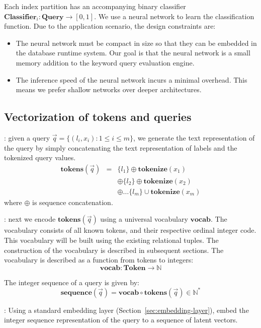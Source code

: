 \documentclass[conference]{IEEEtran}
\begin{document}
Each index partition has an accompanying binary classifier $\mathbf{Classifier}_i : \mathbf{Query}\to[0, 1]$.
We use a neural network to learn the classification function.  Due to the application
scenario, the design constraints are:

\begin{itemize}
\item The neural network must be compact in size so that they can be embedded in
	the database runtime system.  Our goal is that the neural network is a small
	memory addition to the keyword query evaluation engine.
\item The inference speed of the neural network incurs a minimal overhead.  This means
	we prefer shallow networks over deeper architectures.
\end{itemize}

\subsection{Vectorization of tokens and queries}

:  given a query $\vec q=\{(l_i,
x_i): 1\leq i \leq m\}$, we generate the text representation of the query by
simply concatenating the text representation of labels and the tokenized query
values.
\begin{eqnarray*}
	\mathbf{tokens}(\vec q) &=& \{l_1\} \oplus \mathbf{tokenize}(x_1)  \\
				&&  \oplus \{l_2\} \oplus \mathbf{tokenize}(x_2) \\
				&& \oplus \dots \{l_m\} \cup \mathbf{tokenize}(x_m)
\end{eqnarray*}
where $\oplus$ is sequence concatenation.

: next we encode $\mathbf{tokens}(\vec q)$ using a universal
vocabulary $\mathbf{vocab}$.  The vocabulary consists of all known tokens, and their respective
ordinal integer code.  This vocabulary will be built using the existing relational tuples.  The construction of the vocabulary is described in subsequent sections.  The vocabulary is described as a function from tokens to integers:
$$ \mathbf{vocab} : \mathbf{Token} \to \mathbb{N}$$

The integer sequence of a query is given by:
$$
\mathbf{sequence}(\vec q) = \mathbf{vocab}\circ\mathbf{tokens} (\vec q) \in\mathbb{N}^*
$$

:
Using a standard embedding layer (Section~\ref{sec:embedding-layer}), embed the integer sequence representation of the query
to a sequence of latent vectors.
\end{document}
